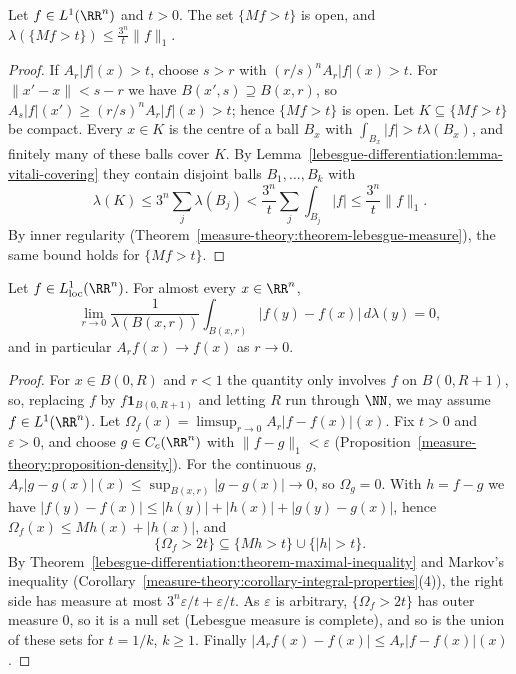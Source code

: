 \begin{theorem}\label{lebesgue-differentiation:theorem-maximal-inequality}
Let $f \in L^1(\RR^n)$ and $t > 0$. The set $\{Mf > t\}$ is open, and $\lambda(\{Mf > t\}) \leq \frac{3^n}{t}\|f\|_1$.
\end{theorem}

\begin{proof}
If $A_r|f|(x) > t$, choose $s > r$ with $(r/s)^nA_r|f|(x) > t$. For $\|x' - x\| < s - r$ we have $B(x', s) \supseteq B(x, r)$, so
$A_s|f|(x') \geq (r/s)^nA_r|f|(x) > t$; hence $\{Mf > t\}$ is open. Let $K \subseteq \{Mf > t\}$ be compact. Every $x \in K$ is the centre of a ball $B_x$ with
$\int_{B_x}|f| > t\lambda(B_x)$, and finitely many of these balls cover $K$. By Lemma~\ref{lebesgue-differentiation:lemma-vitali-covering} they contain disjoint balls
$B_1, \ldots, B_k$ with
\[
\lambda(K) \leq 3^n\sum_j\lambda(B_j) < \frac{3^n}{t}\sum_j\int_{B_j}|f| \leq \frac{3^n}{t}\|f\|_1.
\]
By inner regularity (Theorem~\ref{measure-theory:theorem-lebesgue-measure}), the same bound holds for $\{Mf > t\}$.
\end{proof}

\begin{theorem}\label{lebesgue-differentiation:theorem-lebesgue-differentiation}
Let $f \in L^1_{\mathrm{loc}}(\RR^n)$. For almost every $x \in \RR^n$,
\[
\lim_{r \to 0}\frac{1}{\lambda(B(x, r))}\int_{B(x, r)}|f(y) - f(x)|\,d\lambda(y) = 0,
\]
and in particular $A_rf(x) \to f(x)$ as $r \to 0$.
\end{theorem}

\begin{proof}
For $x \in B(0, R)$ and $r < 1$ the quantity only involves $f$ on $B(0, R + 1)$, so, replacing $f$ by $f\mathbf{1}_{B(0, R+1)}$ and letting $R$ run through $\NN$, we
may assume $f \in L^1(\RR^n)$. Let $\Omega_f(x) = \limsup_{r \to 0}A_r|f - f(x)|(x)$. Fix $t > 0$ and $\varepsilon > 0$, and choose $g \in C_c(\RR^n)$ with
$\|f - g\|_1 < \varepsilon$ (Proposition~\ref{measure-theory:proposition-density}). For the continuous $g$, $A_r|g - g(x)|(x) \leq \sup_{B(x, r)}|g - g(x)| \to 0$, so
$\Omega_g = 0$. With $h = f - g$ we have $|f(y) - f(x)| \leq |h(y)| + |h(x)| + |g(y) - g(x)|$, hence $\Omega_f(x) \leq Mh(x) + |h(x)|$, and
\[
\{\Omega_f > 2t\} \subseteq \{Mh > t\} \cup \{|h| > t\}.
\]
By Theorem~\ref{lebesgue-differentiation:theorem-maximal-inequality} and Markov's inequality (Corollary~\ref{measure-theory:corollary-integral-properties}(4)), the right
side has measure at most $3^n\varepsilon/t + \varepsilon/t$. As $\varepsilon$ is arbitrary, $\{\Omega_f > 2t\}$ has outer measure $0$, so it is a null set (Lebesgue
measure is complete), and so is the union of these sets for $t = 1/k$, $k \geq 1$. Finally $|A_rf(x) - f(x)| \leq A_r|f - f(x)|(x)$.
\end{proof}

